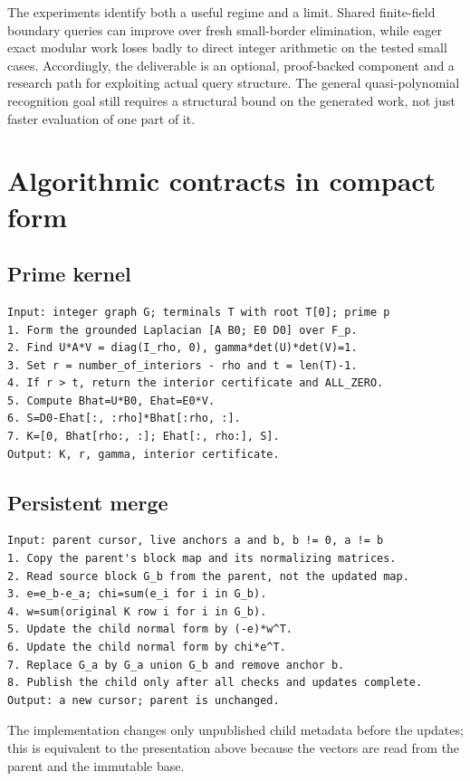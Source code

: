 \documentclass[11pt,letterpaper]{article}
\theoremstyle{definition}\newtheorem{definition}[theorem]{Definition}
\theoremstyle{remark}\newtheorem{remark}[theorem]{Remark}
\begin{document}
The experiments identify both a useful regime and a limit. Shared finite-field boundary queries can improve over fresh small-border elimination, while eager exact modular work loses badly to direct integer arithmetic on the tested small cases. Accordingly, the deliverable is an optional, proof-backed component and a research path for exploiting actual query structure. The general quasi-polynomial recognition goal still requires a structural bound on the generated work, not just faster evaluation of one part of it.

\appendix
\section{Algorithmic contracts in compact form}
\label{app:pseudo}

\subsection{Prime kernel}
\begin{lstlisting}
Input: integer graph G; terminals T with root T[0]; prime p
1. Form the grounded Laplacian [A B0; E0 D0] over F_p.
2. Find U*A*V = diag(I_rho, 0), gamma*det(U)*det(V)=1.
3. Set r = number_of_interiors - rho and t = len(T)-1.
4. If r > t, return the interior certificate and ALL_ZERO.
5. Compute Bhat=U*B0, Ehat=E0*V.
6. S=D0-Ehat[:, :rho]*Bhat[:rho, :].
7. K=[0, Bhat[rho:, :]; Ehat[:, rho:], S].
Output: K, r, gamma, interior certificate.
\end{lstlisting}

\subsection{Persistent merge}
\begin{lstlisting}
Input: parent cursor, live anchors a and b, b != 0, a != b
1. Copy the parent's block map and its normalizing matrices.
2. Read source block G_b from the parent, not the updated map.
3. e=e_b-e_a; chi=sum(e_i for i in G_b).
4. w=sum(original K row i for i in G_b).
5. Update the child normal form by (-e)*w^T.
6. Update the child normal form by chi*e^T.
7. Replace G_a by G_a union G_b and remove anchor b.
8. Publish the child only after all checks and updates complete.
Output: a new cursor; parent is unchanged.
\end{lstlisting}
The implementation changes only unpublished child metadata before the updates; this is equivalent to the presentation above because the vectors are read from the parent and the immutable base.
\end{document}
